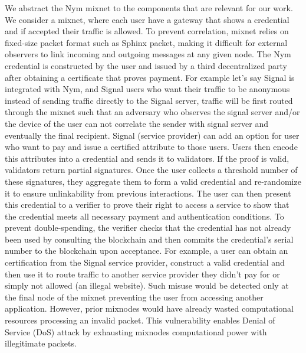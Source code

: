 %
%
We abstract the Nym mixnet to the components that are relevant for our
work. We consider a mixnet, where each user have a gateway that shows a
credential and if accepted their traffic is allowed.  To prevent
correlation, mixnet relies on fixed-size packet format such as Sphinx
packet, making it difficult for external
observers to link incoming and outgoing messages at any given node.  The
Nym credential is constructed by the user and issued by a third
decentralized party after obtaining a certificate that proves payment.  For
example let's say Signal is integrated with Nym, and Signal users who want
their traffic to be anonymous instead of sending traffic directly to the
Signal server, traffic will be first routed through the mixnet such that an
adversary who observes the signal server and/or the device of the user can
not correlate the sender with signal server and eventually the final
recipient. Signal (service provider) can add an option for user who want to
pay and issue a certified attribute to those users. Users then encode this
attributes into a credential and sends it to validators. If the proof is
valid, validators return partial signatures. Once the user collects a
threshold number of these signatures, they aggregate them to form a valid
credential and re-randomize it to ensure unlinkability from previous
interactions. The user can then present this credential to a verifier to
prove their right to access a service to show that the credential meets all
necessary payment and authentication conditions. To prevent
double-spending, the verifier checks that the credential has not already
been used by consulting the blockchain and then commits the credential's
serial number to the blockchain upon acceptance.  For example, a user can
obtain an certification from the Signal service provider, construct a valid
credential and then use it to route traffic to another service provider
they didn't pay for or simply not allowed (an illegal website).  Such
misuse would be detected only at the final node of the mixnet preventing
the user from accessing another application.  However, prior mixnodes would
have already wasted computational resources processing an invalid packet.
This vulnerability enables Denial of Service (DoS) attack by exhausting
mixnodes computational power with illegitimate packets.

